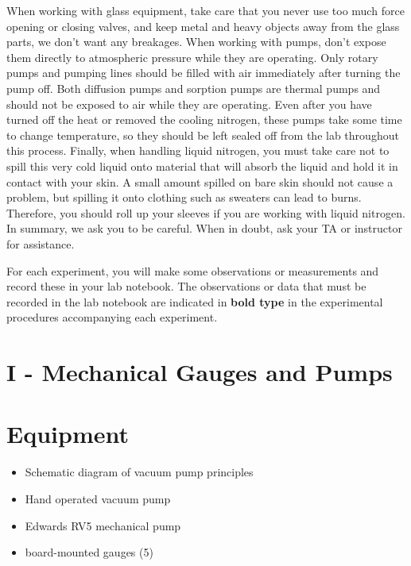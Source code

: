 When working with glass equipment, take care that you never use too much force opening or closing valves, and keep metal and heavy objects away from the glass parts, we don't want any breakages. When working with pumps, don't expose them directly to atmospheric pressure while they are operating. Only rotary pumps and pumping lines should be filled with air immediately after turning the pump off. Both diffusion pumps and sorption pumps are thermal pumps and should not be exposed to air while they are operating. Even after you have turned off the heat or removed the cooling nitrogen, these pumps take some time to change temperature, so they should be left sealed off from the lab throughout this process. Finally, when handling liquid nitrogen, you must take care not to spill this very cold liquid onto material that will absorb the liquid and hold it in contact with your skin. A small amount spilled on bare skin should not cause a problem, but spilling it onto clothing such as sweaters can lead to burns. Therefore, you should roll up your sleeves if you are working with liquid nitrogen. In summary, we ask you to be careful.  When in doubt, ask your TA or instructor for assistance.

For each experiment, you will make some observations or measurements and record these in your lab notebook. The observations or data that must be recorded in the lab notebook are indicated in {\bf bold type} in the experimental procedures accompanying each experiment.

\section{I - Mechanical Gauges and Pumps}

\section{Equipment}

\begin{minipage}[t]{0.5\textwidth}
\begin{itemize}[noitemsep]
\item Schematic diagram of vacuum pump principles
\item Hand operated vacuum pump
\end{itemize}
\end{minipage}
\begin{minipage}[t]{0.5\textwidth}
\begin{itemize}[noitemsep]
\item Edwards RV5 mechanical pump
\item board-mounted gauges (5)
\end{itemize}
\end{minipage}

